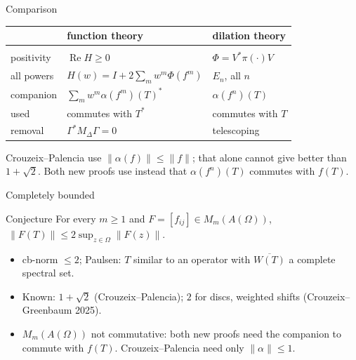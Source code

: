 \documentclass[14pt]{beamer}
\newcommand{\norm}[1]{\lVert #1\rVert}
\DeclareMathOperator{\re}{Re}
\begin{document}
\begin{frame}{Comparison}
  \small
  \begin{tabular}{@{}lll@{}}
     & function theory & dilation theory\\
    \hline\\[-8pt]
    positivity & $\re H\ge0$ & $\Phi=V^*\pi(\cdot)V$\\[2pt]
    all powers & $H(w)=I+2\sum_m w^m\Phi(f^m)$ & $E_n$, all $n$\\[2pt]
    companion & $\sum_m w^m\alpha(f^m)(T)^*$ & $\alpha(f^n)(T)$\\[2pt]
    used & commutes with $T^*$ & commutes with $T$\\[2pt]
    removal & $\Gamma^*M_\Delta\Gamma=0$ & telescoping
  \end{tabular}

  \bigskip
  Crouzeix--Palencia use $\norm{\alpha(f)}\le\norm f$; that alone cannot give better than $1+\sqrt2$.
  Both new proofs use instead that $\alpha(f^n)(T)$ commutes with $f(T)$.
\end{frame}

\begin{frame}{Completely bounded}
  \begin{block}{Conjecture}
    For every $m\ge1$ and $F=[f_{ij}]\in M_m(A(\Omega))$,
    $\ \norm{F(T)}\le2\sup_{z\in\Omega}\norm{F(z)}$.
  \end{block}
  \begin{itemize}\small
    \item cb-norm $\le2$; Paulsen: $T$ similar to an operator with $\overline{W(T)}$ a complete spectral set.
    \item Known: $1+\sqrt2$ (Crouzeix--Palencia); $2$ for discs, weighted shifts (Crouzeix--Greenbaum 2025).
    \item $M_m(A(\Omega))$ not commutative: both new proofs need the companion to commute with $f(T)$. Crouzeix--Palencia need only $\norm\alpha\le1$.
  \end{itemize}
\end{frame}
\end{document}
